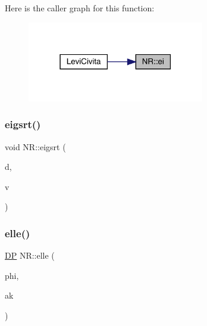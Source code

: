 Here is the caller graph for this function\+:
\nopagebreak
\begin{figure}[H]
\begin{center}
\leavevmode
\includegraphics[width=219pt]{da/d46/namespaceNR_a28d2f7fc957866378bc8d49df208d5bc_icgraph}
\end{center}
\end{figure}
\mbox{\label{namespaceNR_a47b470822fede3df423c4b65fd109d46}} 
\subsubsection{\texorpdfstring{eigsrt()}{eigsrt()}}
{\footnotesize\ttfamily void N\+R\+::eigsrt (\begin{DoxyParamCaption}\item[{\mbox{\hyperlink{namespaceNR_ab293e06a6bf799d8a7ed932b6852bcb8}{Vec\+\_\+\+I\+O\+\_\+\+DP}} \&}]{d,  }\item[{\mbox{\hyperlink{namespaceNR_ad1513aa4697878ed3bff0b8b3c9dd910}{Mat\+\_\+\+I\+O\+\_\+\+DP}} \&}]{v }\end{DoxyParamCaption})}

\mbox{\label{namespaceNR_a1762d8c42e9423b8290b196da5ed3b88}} 
\subsubsection{\texorpdfstring{elle()}{elle()}}
{\footnotesize\ttfamily \mbox{\hyperlink{namespaceNR_af6ff762dd605ff477b8e52387253a02a}{DP}} N\+R\+::elle (\begin{DoxyParamCaption}\item[{const \mbox{\hyperlink{namespaceNR_af6ff762dd605ff477b8e52387253a02a}{DP}}}]{phi,  }\item[{const \mbox{\hyperlink{namespaceNR_af6ff762dd605ff477b8e52387253a02a}{DP}}}]{ak }\end{DoxyParamCaption})}

\mbox{\label{namespaceNR_a1571206bbdfafab7d95c23d356084050}} 
